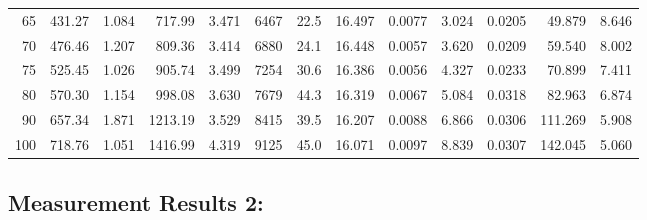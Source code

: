 \documentclass[10pt]{article}
\begin{document}
{\begin{tabular}{|r|rr|rr|rr|rr|rr|r|r|}
       65 &       431.27 &        1.084 &       717.99 &        3.471 &         6467 &         22.5 &       16.497 &       0.0077 &        3.024 &       0.0205 &       49.879 &        8.646 \\
       70 &       476.46 &        1.207 &       809.36 &        3.414 &         6880 &         24.1 &       16.448 &       0.0057 &        3.620 &       0.0209 &       59.540 &        8.002 \\
       75 &       525.45 &        1.026 &       905.74 &        3.499 &         7254 &         30.6 &       16.386 &       0.0056 &        4.327 &       0.0233 &       70.899 &        7.411 \\
       80 &       570.30 &        1.154 &       998.08 &        3.630 &         7679 &         44.3 &       16.319 &       0.0067 &        5.084 &       0.0318 &       82.963 &        6.874 \\
       90 &       657.34 &        1.871 &      1213.19 &        3.529 &         8415 &         39.5 &       16.207 &       0.0088 &        6.866 &       0.0306 &      111.269 &        5.908 \\
      100 &       718.76 &        1.051 &      1416.99 &        4.319 &         9125 &         45.0 &       16.071 &       0.0097 &        8.839 &       0.0307 &      142.045 &        5.060 \\
\hline
\end{tabular}
}



\subsection*{\large \bf Measurement Results 2:}
\end{document}

